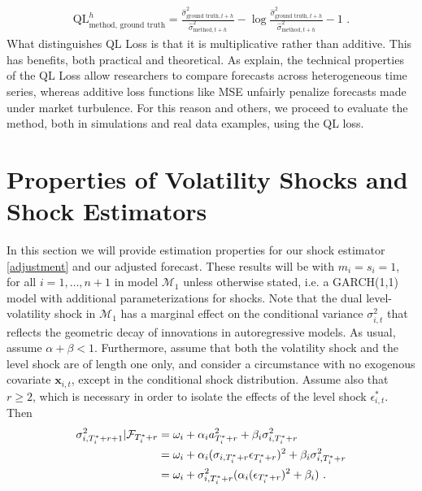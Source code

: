 \documentclass{uiucthesis2021}
\newcommand{\x}{\textbf{x}}
\def\mc#1{\mathcal{#1}} %
\def\mc#1{\mathcal{#1}}
\theoremstyle{definition}
\begin{document}
\begin{align*}
\text{QL}^{h}_{\text{method, ground truth}} = \frac{\hat\sigma^{2}_{\text{ground truth},t+h}}{ \hat\sigma^{2}_{\text{method},t+h}} - \log{\frac{\hat\sigma^{2}_{\text{ground truth},t+h}}{ \hat\sigma^{2}_{\text{method},t+h}}} -1 \text{ .}
\end{align*}
What distinguishes QL Loss is that it is multiplicative rather than additive.  This has benefits, both practical and theoretical.  As \citet{brownlees2011practical} explain, the technical properties of the QL Loss allow researchers to compare forecasts across heterogeneous time series, whereas additive loss functions like MSE unfairly penalize forecasts made under market turbulence.  For this reason and others, we proceed to evaluate the method, both in simulations and real data examples, using the QL loss.

\section{Properties of Volatility Shocks and Shock Estimators}\label{SVF_properties}

In this section we will provide estimation properties for our shock  estimator \eqref{adjustment} and our adjusted forecast. These results will be with $m_i = s_i = 1$, for all $i = 1,\ldots,n+1$ in model $\mc{M}_1$ unless otherwise stated, i.e. a GARCH(1,1) model with additional parameterizations for shocks. Note that the dual level-volatility shock in $\mc{M}_1$ has a marginal effect on the conditional variance $\sigma^{2}_{i,t}$ that reflects the geometric decay of innovations in autoregressive models.  As usual, assume $\alpha+\beta < 1$.  Furthermore, assume that both the volatility shock and the level shock are of length one only, and consider a circumstance with no exogenous covariate $\x_{i,t}$, except in the conditional shock distribution. Assume also that $r\geq 2$, which is necessary in order to isolate the effects of the level shock $\epsilon^{*}_{i,t}$.  Then
\begin{align}
\sigma^{2}_{i,T_{i}^{*}+r+1} | \mathcal{F}_{T_{i}^{*}+r} & = \omega_{i} + \alpha_{i} a_{T_{i}^{*}+r}^{2} + \beta_{i}\sigma^{2}_{i,T_{i}^{*}+r} \label{eq0}\\
& = \omega_{i} + \alpha_{i}(\sigma_{i,T_{i}^{*}+r}\epsilon_{T_{i}^{*}+r})^{2} + \beta_{i}\sigma^{2}_{i,T_{i}^{*}+r}\notag \\
& = \omega_{i} + \sigma^{2}_{i,T_{i}^{*}+r}(\alpha_{i} (\epsilon_{T_{i}^{*}+r})^{2} + \beta_{i}) \text{ .}\notag 
\end{align}
\end{document}
